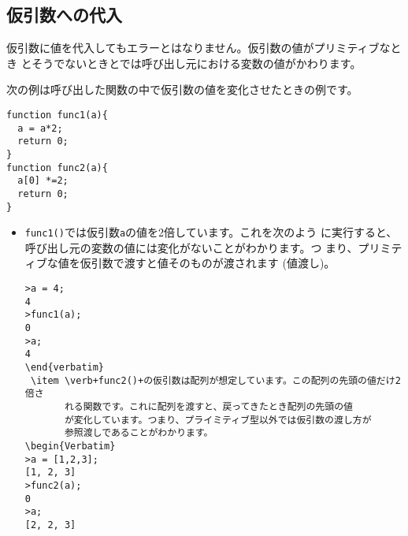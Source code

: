 \subsection{仮引数への代入}
仮引数に値を代入してもエラーとはなりません。仮引数の値がプリミティブなとき
とそうでないときとでは呼び出し元における変数の値がかわります。

 次の例は呼び出した関数の中で仮引数の値を変化させたときの例です。
\begin{Verbatim}
function func1(a){
  a = a*2;
  return 0;
}
function func2(a){
  a[0] *=2;
  return 0;
}
\end{Verbatim}

\begin{itemize}
 \item \verb+func1()+では仮引数\verb+a+の値を2倍しています。これを次のよう
       に実行すると、呼び出し元の変数の値には変化がないことがわかります。つ
       まり、プリミティブな値を仮引数で渡すと値そのものが渡されます
       (値渡し)。
\begin{Verbatim}
>a = 4;
4
>func1(a);
0
>a;
4
\end{verbatim}
 \item \verb+func2()+の仮引数は配列が想定しています。この配列の先頭の値だけ2倍さ
       れる関数です。これに配列を渡すと、戻ってきたとき配列の先頭の値
       が変化しています。つまり、プライミティブ型以外では仮引数の渡し方が
       参照渡しであることがわかります。
\begin{Verbatim}
>a = [1,2,3];
[1, 2, 3]
>func2(a);
0
>a;
[2, 2, 3]
\end{Verbatim}
\end{itemize}

